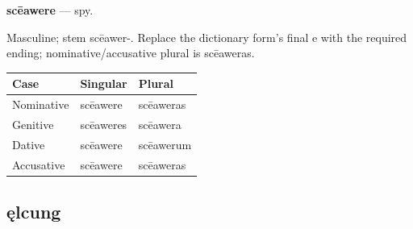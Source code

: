 \par\begin{minipage}{\linewidth}\raggedright
\textbf{scēawere} — spy.

Masculine; stem scēawer-. Replace the dictionary form’s final e with the required ending; nominative/\allowbreak{}accusative plural is scēaweras.

\par\begingroup
\fontsize{10.5}{13.2}\selectfont
\setlength{\LTleft}{0pt}\setlength{\LTright}{\fill}
\noindent
\begin{tabular}{@{}>{\raggedright\arraybackslash}p{39.46mm}>{\raggedright\arraybackslash}p{39.46mm}>{\raggedright\arraybackslash}p{39.46mm}@{}}
\toprule
\textbf{Case} & \textbf{Singular} & \textbf{Plural} \\
\midrule
Nominative & scēawere & scēaweras \\
Genitive & scēaweres & scēawera \\
Dative & scēawere & scēawerum \\
Accusative & scēawere & scēaweras \\
\bottomrule
\end{tabular}
\par\endgroup

\end{minipage}\par
{}
\subsection*{ęlcung}

